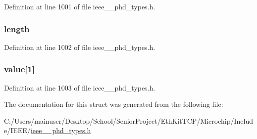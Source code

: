 Definition at line 1001 of file ieee\+\_\+\_\+phd\+\_\+types.\+h.

\hypertarget{struct___config_object_list_a3743679e4ff85e3e1b3fc2e59973fbb3}{}
\subsubsection[{length}]{ length}\label{struct___config_object_list_a3743679e4ff85e3e1b3fc2e59973fbb3}


Definition at line 1002 of file ieee\+\_\+\_\+phd\+\_\+types.\+h.

\hypertarget{struct___config_object_list_a57fab9fcd4b4fee15a2363d4505d9cf5}{}
\subsubsection[{value}]{ value\mbox{[}1\mbox{]}}\label{struct___config_object_list_a57fab9fcd4b4fee15a2363d4505d9cf5}


Definition at line 1003 of file ieee\+\_\+\_\+phd\+\_\+types.\+h.



The documentation for this struct was generated from the following file\+:\begin{DoxyCompactItemize}
\item 
C\+:/\+Users/mainuser/\+Desktop/\+School/\+Senior\+Project/\+Eth\+Kit\+T\+C\+P/\+Microchip/\+Include/\+I\+E\+E\+E/\hyperlink{ieee__11073__phd__types_8h}{ieee\+\_\+\_\+phd\+\_\+types.\+h}\end{DoxyCompactItemize}
